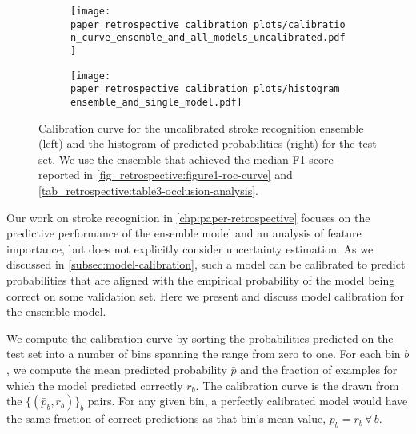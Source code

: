 \begin{figure}
    \centering
    \begin{subfigure}[c]{0.49\columnwidth}
        \centering
        \texttt{[image: paper\_retrospective\_calibration\_plots/calibration\_curve\_ensemble\_and\_all\_models\_uncalibrated.pdf]}
    \end{subfigure}
    \hfill
    \begin{subfigure}[c]{0.49\columnwidth}
        \centering
        \texttt{[image: paper\_retrospective\_calibration\_plots/histogram\_ensemble\_and\_single\_model.pdf]}
    \end{subfigure}
    \caption[Calibration curve for the uncalibrated stroke recognition ensemble and empirical distribution of predicted probabilities.]{ Calibration curve for the uncalibrated stroke recognition ensemble (left) and the histogram of predicted probabilities (right) for the test set. We use the ensemble that achieved the median F1-score reported in \cref{fig_retrospective:figure1-roc-curve} and \cref{tab_retrospective:table3-occlusion-analysis}.}
    \label{fig_discussion:retrospective-paper-calibration-curve-of-uncalibrated-model}
\end{figure}

Our work on stroke recognition in \cref{chp:paper-retrospective} focuses on the predictive performance of the ensemble model and an analysis of feature importance, but does not explicitly consider uncertainty estimation. 
As we discussed in \cref{subsec:model-calibration}, such a model can be calibrated to predict probabilities that are aligned with the empirical probability of the model being correct on some validation set. Here we present and discuss model calibration for the ensemble model. 

We compute the calibration curve by sorting the probabilities predicted on the test set into a number of bins spanning the range from zero to one. For each bin $b$, we compute the mean predicted probability $\bar{p}$ and the fraction of examples for which the model predicted correctly $r_{b}$. The calibration curve is the drawn from the $\{(\bar{p}_{b}, r_{b})\}_b$ pairs. For any given bin, a perfectly calibrated model would have the same fraction of correct predictions as that bin's mean value, $\bar{p}_{b} = r_{b}\,\forall\,b$. 


